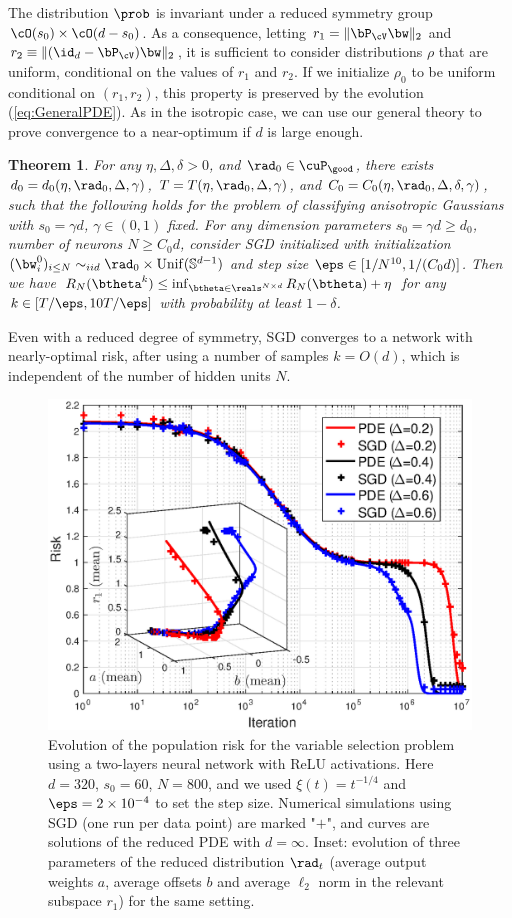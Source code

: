 \documentclass[11pt]{article}
\newtheorem{theorem}{Theorem}
\renewcommand{\eqref}[1]{(\ref{#1})}
\begin{document}
The distribution $\prob$ is invariant under a reduced symmetry group $\cO(s_0)\times \cO(d-s_0)$. As a consequence, letting $r_1= \|\bP_{\cV}\bw\|_2$ and
$r_2\equiv \|(\id_d-\bP_{\cV})\bw\|_2$, it is sufficient to consider distributions $\rho$ that are uniform, conditional on the values of $r_1$ and
$r_2$. If we initialize $\rho_0$ to be uniform conditional on $(r_1,r_2)$, this property is preserved 
by the evolution \eqref{eq:GeneralPDE}.
As in the isotropic case, we can use our general theory to prove convergence to a near-optimum if $d$ is large enough. 
%
\begin{theorem}\label{thm:ConvergenceAnisotropic}
For any $\eta, \Delta, \delta > 0$, and $\rad_0 \in \cuP_{\good}$, there exists $d_0 = d_0(\eta, \rad_0, \Delta,\gamma)$, $T = T(\eta, \rad_0, \Delta,\gamma)$, and $C_0 = C_0(\eta, \rad_0, \Delta, \delta,\gamma)$, such that the following holds for the problem of 
classifying anisotropic Gaussians with $s_0=\gamma d$, $\gamma\in (0,1)$ fixed.
For any dimension parameters  $s_0 = \gamma d \ge d_0$, number of neurons $N \ge C_0 d $, consider SGD initialized with initialization $(\bw_i^0)_{i \le N} \sim_{iid}  \rad_0 \times {\rm Unif}(\mathbb S^{d - 1})$ and step size $\eps \in [1/N^{10}, 1/(C_0 d)]$. Then we have 
$R_{N}(\btheta^{k}) \le \inf_{\btheta\in\reals^{N\times d}} R_{N}(\btheta) + \eta$ for any $k \in [T/\eps, 10 T/\eps]$ with probability at least $1 - \delta$.
\end{theorem}
%
Even with a reduced degree of symmetry, SGD converges to a network with nearly-optimal  risk, after using a number of samples 
$k = O(d)$, which is independent of the number of hidden units $N$.
%
\begin{figure}[t!]
\centering
\includegraphics[width=0.9\linewidth]{aniPDEall_J400_d320_k60_n800.eps}
\caption{Evolution of the population risk for the variable selection problem using a two-layers neural network with ReLU activations. Here $d=320$, $s_0 =60$,  $N=800$, and
we used $\xi(t) = t^{-1/4}$ and $\eps=2\times 10^{-4}$ to set the step size. Numerical simulations using SGD (one run per data point) are marked "$+$",
and curves are solutions of the reduced PDE with $d=\infty$. 
Inset: evolution of three parameters of the reduced distribution
$\rad_t$ (average output weights $a$, average offsets $b$ and average $\ell_2$ norm in the relevant subspace $r_1$) for the same setting.\label{fig:RiskAnisotropic}}
\end{figure}
\end{document}
